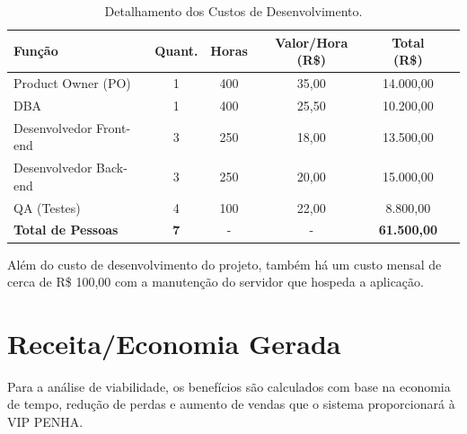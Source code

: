 \documentclass[
	12pt,				%
	openany,			%
	twoside,			%
	a4paper,			%
	english,			%
	brazil				%
	]{abntex2}
\begin{document}
\begin{table}[hbtp]
    \centering
    \caption{Detalhamento dos Custos de Desenvolvimento.}
    \label{tab:custos_desenvolvimento_simples}
    \begin{tabular}{|l|c|c|c|c|c|}
        \hline
        \textbf{Função} & \textbf{Quant.} & \textbf{Horas} & \textbf{Valor/Hora (R\$)} & \textbf{Total (R\$)} \\
        \hline
        Product Owner (PO)    & 1 & 400 & 35,00 & 14.000,00 \\
        \hline
        DBA     & 1 & 400 & 25,50 & 10.200,00 \\
        \hline
        Desenvolvedor Front-end & 3 & 250 & 18,00 & 13.500,00 \\
        \hline
        Desenvolvedor Back-end  & 3 & 250 & 20,00 & 15.000,00 \\
        \hline
        QA (Testes)           & 4 & 100 & 22,00 & 8.800,00 \\
        \hline
        \textbf{Total de Pessoas} & \textbf{7} & - & - & \textbf{61.500,00} \\
        \hline
    \end{tabular}
\end{table}

\FloatBarrier

Além do custo de desenvolvimento do projeto, também há um custo mensal de cerca de R\$ 100,00 com a manutenção do servidor que hospeda a aplicação.

\section{Receita/Economia Gerada}

Para a análise de viabilidade, os benefícios são calculados com base na economia de tempo, redução de perdas e aumento de vendas que o sistema proporcionará à VIP PENHA.
\end{document}
